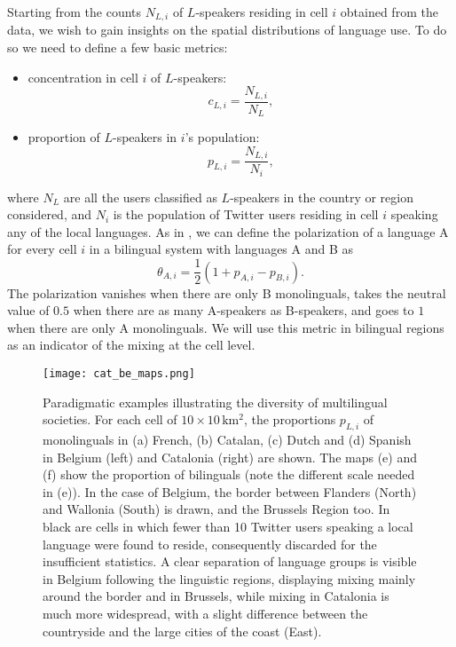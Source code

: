 \documentclass[../thesis.tex]{subfiles}
\begin{document}
Starting from the counts $N_{L,i}$ of $L$-speakers residing in cell $i$ obtained from
the data, we wish to gain insights on the spatial distributions of language use. To do
so we need to define a few basic metrics:
\begin{itemize}
       \item concentration in cell $i$ of $L$-speakers:
       \begin{equation}
       \label{eq:def_conc}
              c_{L,i} = \frac{N_{L,i}}{N_L},
       \end{equation}
       \item proportion of $L$-speakers in $i$'s population:
       \begin{equation}
       \label{eq:def_prop}
              p_{L,i} = \frac{N_{L,i}}{N_i},
       \end{equation}
\end{itemize}
where $N_L$ are all the users classified as $L$-speakers in the country or region
considered, and $N_i$ is the population of Twitter users residing in cell $i$ speaking
any of the local languages. As in \cite{MocanuTwitterBabel2013}, we can define the
polarization of a language A for every cell $i$ in a bilingual system with languages A
and B as 
\begin{equation}
\label{eq:def_polar}
    \theta_{A, i} = \frac{1}{2} (1 + p_{A,i} - p_{B,i}). 
\end{equation}
The polarization vanishes when there are only B monolinguals, takes the neutral value of
$0.5$ when there are as many A-speakers as B-speakers, and goes to $1$ when there are
only A monolinguals. We will use this metric in bilingual regions as an indicator of
the mixing at the cell level. 

\begin{figure*}[p!]
  \centering
  \texttt{[image: cat\_be\_maps.png]}
  \caption{Paradigmatic examples illustrating the diversity of multilingual societies.
  For each cell of $10 \times 10 \, \si{\kilo \meter \squared}$, the proportions
  $p_{L,i}$ of monolinguals in (a) French, (b) Catalan, (c) Dutch and (d) Spanish in
  Belgium (left) and Catalonia (right) are shown. The maps (e) and (f) show the
  proportion of bilinguals (note the different scale needed in (e)). In the case of
  Belgium, the border between Flanders (North) and Wallonia (South) is drawn, and the
  Brussels Region too. In black are cells in which fewer than 10 Twitter users speaking
  a local language were found to reside, consequently discarded for the insufficient
  statistics. A clear separation of language groups is visible in Belgium following the
  linguistic regions, displaying mixing mainly around the border and in Brussels, while
  mixing in Catalonia is much more widespread, with a slight difference between the
  countryside and the large cities of the coast (East).}
  \label{fig:cat_be_maps}
\end{figure*}
\end{document}
